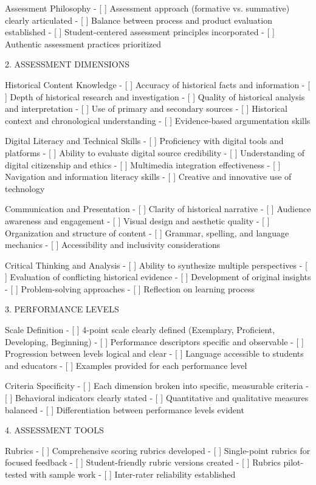 \begin{appendices}
    Assessment Philosophy
- [ ] Assessment approach (formative vs. summative) clearly articulated
- [ ] Balance between process and product evaluation established
- [ ] Student-centered assessment principles incorporated
- [ ] Authentic assessment practices prioritized

   2. ASSESSMENT DIMENSIONS

    Historical Content Knowledge
- [ ] Accuracy of historical facts and information
- [ ] Depth of historical research and investigation
- [ ] Quality of historical analysis and interpretation
- [ ] Use of primary and secondary sources
- [ ] Historical context and chronological understanding
- [ ] Evidence-based argumentation skills

    Digital Literacy and Technical Skills
- [ ] Proficiency with digital tools and platforms
- [ ] Ability to evaluate digital source credibility
- [ ] Understanding of digital citizenship and ethics
- [ ] Multimedia integration effectiveness
- [ ] Navigation and information literacy skills
- [ ] Creative and innovative use of technology

    Communication and Presentation
- [ ] Clarity of historical narrative
- [ ] Audience awareness and engagement
- [ ] Visual design and aesthetic quality
- [ ] Organization and structure of content
- [ ] Grammar, spelling, and language mechanics
- [ ] Accessibility and inclusivity considerations

    Critical Thinking and Analysis
- [ ] Ability to synthesize multiple perspectives
- [ ] Evaluation of conflicting historical evidence
- [ ] Development of original insights
- [ ] Problem-solving approaches
- [ ] Reflection on learning process

   3. PERFORMANCE LEVELS

    Scale Definition
- [ ] 4-point scale clearly defined (Exemplary, Proficient, Developing, Beginning)
- [ ] Performance descriptors specific and observable
- [ ] Progression between levels logical and clear
- [ ] Language accessible to students and educators
- [ ] Examples provided for each performance level

    Criteria Specificity
- [ ] Each dimension broken into specific, measurable criteria
- [ ] Behavioral indicators clearly stated
- [ ] Quantitative and qualitative measures balanced
- [ ] Differentiation between performance levels evident

   4. ASSESSMENT TOOLS

    Rubrics
- [ ] Comprehensive scoring rubrics developed
- [ ] Single-point rubrics for focused feedback
- [ ] Student-friendly rubric versions created
- [ ] Rubrics pilot-tested with sample work
- [ ] Inter-rater reliability established


\end{appendices}
